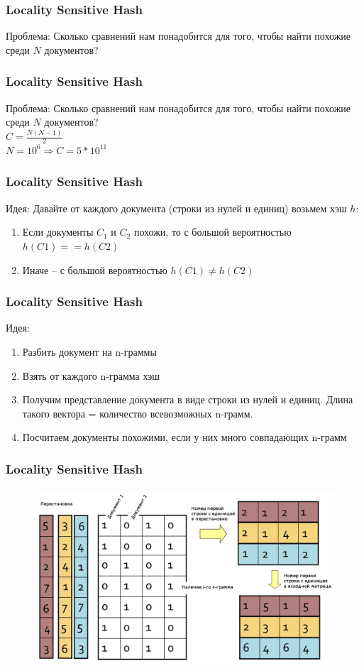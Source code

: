 \documentclass[10pt]{beamer}
\begin{document}
\begin{frame}\frametitle{Locality Sensitive Hash}
	\centering
	\alert{Проблема}: Сколько сравнений нам понадобится  для того, чтобы найти похожие среди $N$ документов?\\
\end{frame}

\begin{frame}\frametitle{Locality Sensitive Hash}
	\alert{Проблема}: Сколько сравнений нам понадобится  для того, чтобы найти похожие среди $N$ документов?\\
	\bigbreak
	$C = \frac{N(N-1)}{2}$\\
	\bigbreak
	$N = 10^6 \Rightarrow C = 5*10^{11}$
\end{frame}

\begin{frame}\frametitle{Locality Sensitive Hash}
	\alert{Идея}: Давайте от каждого документа (строки из нулей и единиц) возьмем хэш $h$:\\
	\begin{enumerate} [--]
	\item Если документы $C_1$ и $C_2$ похожи, то с большой вероятностью $h(C1) == h(C2)$\\
	\item Иначе -- с большой вероятностью $h(C1) \neq h(C2)$
	\end{enumerate}
\end{frame}

\begin{frame}\frametitle{Locality Sensitive Hash}
	\alert{Идея}: \\
	\begin{enumerate}
	\item Разбить документ на n-граммы
	\item Взять от каждого n-грамма хэш
	\item Получим представление документа в виде строки из нулей и единиц. Длина такого вектора = количество всевозможных n-грамм.
	\item Посчитаем документы похожими, если у них много совпадающих n-грамм
	\end{enumerate}
\end{frame}

\begin{frame}\frametitle{Locality Sensitive Hash}
	\begin{figure}[htbp]
	\centering
	\includegraphics[height=190pt]{images/min-hash1}  
	\end{figure}
\end{frame}
\end{document}
